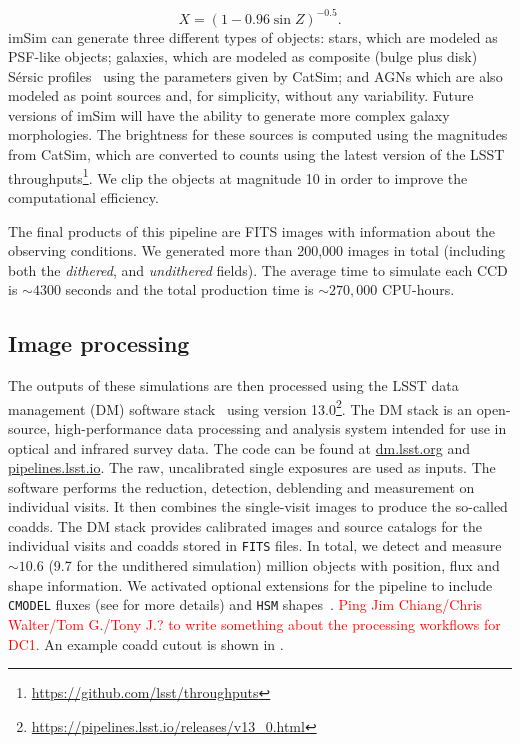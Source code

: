 \documentclass[twocolumn]{aastex62}
\begin{document}
\begin{equation}
X = (1 - 0.96\sin{Z})^{-0.5}.
\end{equation}
imSim can generate three different types of objects: stars, which are modeled as PSF-like objects; galaxies, which are modeled as composite (bulge plus disk) S\'{e}rsic profiles~\citep{1963BAAA....6...41S} using
the parameters given by CatSim; and AGNs which are also modeled as point sources and, for simplicity, without any variability. Future versions of imSim will have the ability to generate more complex galaxy morphologies. The brightness for these sources is computed using the magnitudes from CatSim, which are converted to counts using the latest version of the LSST throughputs\footnote{\url{https://github.com/lsst/throughputs}}. We clip the objects at magnitude 10 in order to improve the computational efficiency.

The final products of this pipeline are FITS images with information about the observing conditions. We generated more than 200,000 images in total (including both the \textit{dithered}, and \textit{undithered} fields). The average time to simulate each CCD is $\sim 4300$ seconds and the total production time is $\sim 270,000$ CPU-hours.

\subsection{Image processing}
\label{sec:image_processing_pipeline}

The outputs of these simulations are then processed using the LSST data management (DM) software stack~\citep{Overview,ScienceBook,WhitePaper,2018PASJ...70S...5B,2015arXiv151207914J} using version 13.0\footnote{\url{https://pipelines.lsst.io/releases/v13_0.html}}. The DM stack is an open-source, high-performance data processing and analysis system intended for use in optical and infrared survey data. The code can be found at \url{dm.lsst.org} and \url{pipelines.lsst.io}. The raw, uncalibrated single exposures are used as inputs. The software performs the reduction, detection, deblending and measurement on individual visits. It then combines the single-visit images to produce the so-called coadds. The DM stack provides calibrated images and source catalogs for the individual visits and coadds stored in \texttt{FITS} files. In total, we detect and measure $\sim 10.6$ (9.7 for the undithered simulation) million objects with position, flux and shape information. We activated optional extensions for the pipeline to include \texttt{CMODEL} fluxes (see \cite{2018PASJ...70S...5B} for more details) and \texttt{HSM} shapes~\citep{2003MNRAS.343..459H,2005MNRAS.361.1287M}.
\textcolor{red}{Ping Jim Chiang/Chris Walter/Tom G./Tony J.? to write something about the processing workflows for DC1.}
An example coadd cutout is shown in .
\end{document}
